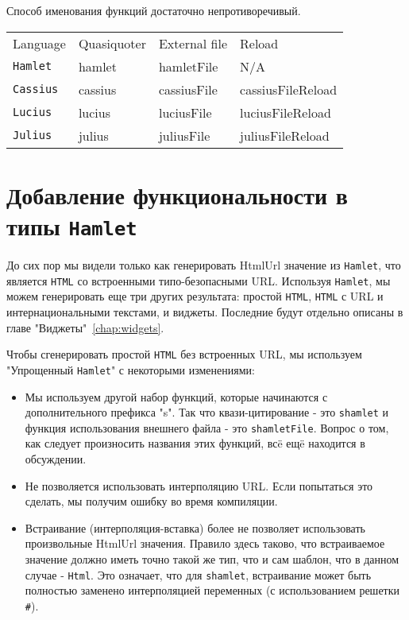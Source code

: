 Способ именования функций достаточно непротиворечивый.
\begin{tabular}{l l l l}
Language & Quasiquoter & External file & Reload \\
\texttt{Hamlet}   & hamlet      & hamletFile    & N/A    \\
\texttt{Cassius}  & cassius     & cassiusFile   & cassiusFileReload \\
\texttt{Lucius}   & lucius      & luciusFile    & luciusFileReload \\
\texttt{Julius}   & julius      & juliusFile    & juliusFileReload \\
\end{tabular}

\section{Добавление функциональности в типы \texttt{Hamlet}}
До сих пор мы видели только как генерировать HtmlUrl значение из \texttt{Hamlet}, что
является \texttt{HTML} со встроенными типо-безопасными URL. Используя \texttt{Hamlet},
мы можем генерировать еще три других результата: простой \texttt{HTML}, \texttt{HTML} с URL и
интернациональными текстами, и виджеты.
Последние будут отдельно описаны в главе "Виджеты"~\ref{chap:widgets}.

Чтобы сгенерировать простой \texttt{HTML} без встроенных URL, мы используем
"Упрощенный \texttt{Hamlet}" с некоторыми изменениями:

\begin{itemize}
\item Мы используем другой набор функций, которые начинаются с дополнительного
префикса "s". Так что квази-цитирование - это \texttt{shamlet} и функция
использования внешнего файла - это \texttt{shamletFile}. Вопрос о том, как следует произносить
названия этих функций, всë ещë находится в обсуждении.
\item Не позволяется использовать интерполяцию URL. Если попытаться это сделать,
мы получим ошибку во время компиляции.
\item Встраивание (интерполяция-вставка) более не позволяет использовать произвольные
HtmlUrl значения. Правило здесь таково, что встраиваемое значение должно иметь
точно такой же тип, что и сам шаблон, что в данном случае - \lstinline!Html!. Это означает,
что для \texttt{shamlet}, встраивание может быть полностью заменено интерполяцией
переменных (с использованием решетки \texttt{\#}).
\end{itemize}


